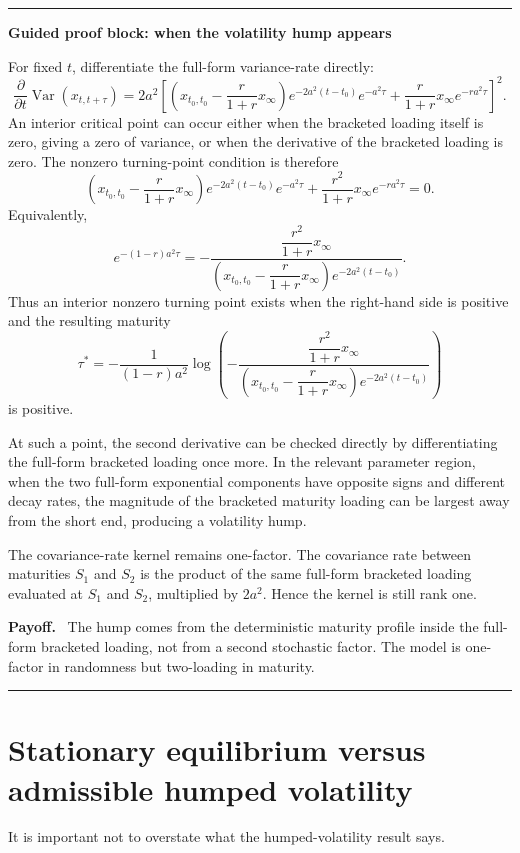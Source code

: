 \documentclass[11pt]{article}
\theoremstyle{plainbreak}
\newenvironment{proofblock}[1]{%
    \vspace{0.5em}\hrule\vspace{0.7em}%
    {\bfseries Guided proof block: #1}\par\vspace{0.2em}%
}{%
    \vspace{0.5em}\hrule\vspace{0.7em}%
}
\newenvironment{takeaway}{%
    \vspace{0.4em}\noindent\textbf{Payoff.}\ }{\par\vspace{0.4em}}
\begin{document}
\begin{proofblock}{when the volatility hump appears}
For fixed \(t\), differentiate the full-form variance-rate directly:
\[
\frac{\partial}{\partial t}\operatorname{Var}(x_{t,t+\tau})
=
2a^2
\left[
\left(
 x_{t_0,t_0}-\frac{r}{1+r}x_\infty
\right)
e^{-2a^2(t-t_0)}e^{-a^2\tau}
+
\frac{r}{1+r}x_\infty e^{-ra^2\tau}
\right]^2.
\]
An interior critical point can occur either when the bracketed loading itself is zero, giving a zero of variance, or when the derivative of the bracketed loading is zero. The nonzero turning-point condition is therefore
\[
\left(
 x_{t_0,t_0}-\frac{r}{1+r}x_\infty
\right)
e^{-2a^2(t-t_0)}e^{-a^2\tau}
+
\frac{r^2}{1+r}x_\infty e^{-ra^2\tau}
=0.
\]
Equivalently,
\[
e^{-(1-r)a^2\tau}
=
-
\frac{\dfrac{r^2}{1+r}x_\infty}
{\left(x_{t_0,t_0}-\dfrac{r}{1+r}x_\infty\right)e^{-2a^2(t-t_0)}}.
\]
Thus an interior nonzero turning point exists when the right-hand side is positive and the resulting maturity
\[
\tau^*
=
-\frac{1}{(1-r)a^2}
\log\left(
-
\frac{\dfrac{r^2}{1+r}x_\infty}
{\left(x_{t_0,t_0}-\dfrac{r}{1+r}x_\infty\right)e^{-2a^2(t-t_0)}}
\right)
\]
is positive.

At such a point, the second derivative can be checked directly by differentiating the full-form bracketed loading once more. In the relevant parameter region, when the two full-form exponential components have opposite signs and different decay rates, the magnitude of the bracketed maturity loading can be largest away from the short end, producing a volatility hump.

The covariance-rate kernel remains one-factor. The covariance rate between maturities \(S_1\) and \(S_2\) is the product of the same full-form bracketed loading evaluated at \(S_1\) and \(S_2\), multiplied by \(2a^2\). Hence the kernel is still rank one.

\begin{takeaway}
The hump comes from the deterministic maturity profile inside the full-form bracketed loading, not from a second stochastic factor. The model is one-factor in randomness but two-loading in maturity.
\end{takeaway}
\end{proofblock}


\section{Stationary equilibrium versus admissible humped volatility}

It is important not to overstate what the humped-volatility result says.
\end{document}
